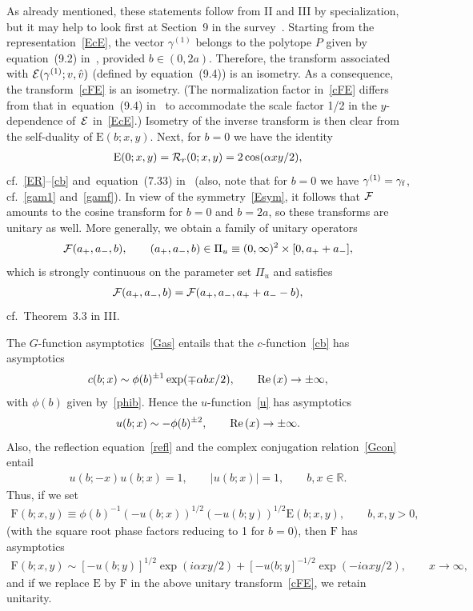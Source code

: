 \documentclass[11pt]{article}
\numberwithin{equation}{section}
\newcommand{\R}{{\mathbb R}}
\newcommand{\re}{{\rm Re}\, }
\newcommand{\cE}{{\cal E}}
\newcommand{\cR}{{\cal R}}
\newcommand{\cF}{{\cal F}}
\newcommand{\rE}{{\mathrm E}}
\newcommand{\rF}{{\mathrm F}}
\newcommand{\aaa}{a_{+},a_{-}}
\begin{document}
As already mentioned, these statements follow from II and III by specialization, but it may help to look f\/irst at Section~9 in the survey~\cite{Rsurv}. Starting from the representation~\eqref{EcE}, the
vector $\gamma^{(1)}$ belongs to the polytope $P$ given by equation~(9.2) in~\cite{Rsurv}, provided $b\in (0,2a)$. Therefore, the transform associated with $\cE(\gamma^{(1)};v,\hat{v})$ (def\/ined by equation~(9.4)) is an isometry. As a consequence, the transform~\eqref{cFE} is an isometry. (The normalization factor in~\eqref{cFE} dif\/fers from that in~equation~(9.4) in~\cite{Rsurv} to accommodate the scale factor 1/2 in the $y$-dependence of~$\cE$ in~\eqref{EcE}.) Isometry of the inverse transform is then clear from the self-duality of $\rE(b;x,y)$. Next, for $b=0$ we have the identity
\begin{gather}\label{ER0}
\rE(0;x,y)=\cR_r(0;x,y)=2\cos(\alpha xy/2),
\end{gather}
cf.~\eqref{ER}--\eqref{cb} and~equation~(7.33) in~\cite{Rsurv} (also, note that for $b=0$ we have $\gamma^{(1)}=\gamma_{\rm f}$, cf.~\eqref{gam1} and~\eqref{gamf}). In view of the symmetry~\eqref{Esym},
it follows that $\cF$ amounts to the cosine transform for $b=0$ and $b=2a$, so these transforms are unitary as well. More generally, we obtain a family of unitary operators
\begin{gather}
\cF(\aaa,b),\qquad (\aaa,b)\in \Pi_u\equiv(0,\infty)^2\times[0,a_{+}+a_{-}],
\end{gather}
which is strongly continuous on the parameter set $\Pi_u$ and satisf\/ies
\begin{gather}\label{cFsym}
\cF(\aaa, b)=\cF(\aaa, a_{+}+a_{-}-b),
\end{gather}
cf.~Theorem~3.3 in III.

The $G$-function asymptotics~\eqref{Gas}
entails that the $c$-function~\eqref{cb} has asymptotics
\begin{gather}\label{cas}
c(b;x)\sim \phi(b)^{\pm 1}\exp(\mp \alpha bx/2),\qquad \re (x)\to\pm\infty,
\end{gather}
with $\phi(b)$ given by~\eqref{phib}. Hence the
$u$-function~\eqref{u} has asymptotics
\begin{gather}\label{uas}
u(b;x)\sim -\phi(b)^{\pm 2},\qquad \re ( x)\to  \pm\infty.
\end{gather}
Also, the ref\/lection equation~\eqref{refl} and the complex conjugation relation~\eqref{Gcon}
entail
\begin{gather}
u(b;-x)u(b;x)=1,\qquad |u(b;x)|=1,\qquad b,x\in\R.
\end{gather}
Thus, if we set
\begin{gather}\label{Fdef}
\rF(b;x,y)\equiv \phi(b)^{-1}(-u(b;x))^{1/2}(-u(b;y))^{1/2}\rE(b;x,y),\qquad b,x,y>0,
\end{gather}
(with the square root phase factors reducing to 1 for $b=0$), then $\rF$ has asymptotics
\begin{gather}\label{Fas}
\rF(b;x,y)\sim [-u(b;y)]^{1/2}\exp(i\alpha xy/2) +[-u(b;y]^{-1/2}\exp(-i\alpha xy/2),\qquad x\to \infty,
\end{gather}
and if we replace $\rE$ by $\rF$ in the above unitary transform~\eqref{cFE}, we retain unitarity.
\end{document}

